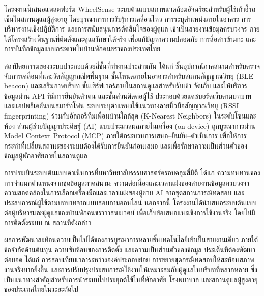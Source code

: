 
โครงงานนี้เสนอแพลตฟอร์ม WheelSense ระบบต้นแบบสภาพแวดล้อมอัจฉริยะสำหรับผู้ใช้เก้าอี้รถเข็นในสถานดูแลผู้สูงอายุ
โดยบูรณาการการรับรู้การเคลื่อนไหว การระบุตำแหน่งภายในอาคาร การบริหารงานเชิงปฏิบัติการ
และการสนับสนุนการตัดสินใจของผู้ดูแล เข้าเป็นสายงานข้อมูลครบวงจร
ภายใต้โครงสร้างพื้นฐานที่ติดตั้งและดูแลรักษาได้จริง
เพื่อแก้ปัญหาความปลอดภัย การสื่อสารข้ามกะ
และการบันทึกข้อมูลแบบกระดาษในบ้านพักคนชราของประเทศไทย

สถาปัตยกรรมของระบบประกอบด้วยสี่ชั้นที่ทำงานประสานกัน
ได้แก่ ชั้นอุปกรณ์ภาคสนามสำหรับตรวจจับการเคลื่อนที่และวัดสัญญาณชีพพื้นฐาน
ชั้นโหนดภายในอาคารสำหรับสแกนสัญญาณวิทยุ (BLE beacon) และเสริมภาพบริบท
ชั้นเซิร์ฟเวอร์ภายในสถานดูแลสำหรับรับเข้า จัดเก็บ
และให้บริการข้อมูลผ่าน API ที่มีการยืนยันตัวตน
และชั้นส่วนติดต่อผู้ใช้ ประกอบด้วยแดชบอร์ดเว็บตามบทบาทและแอปพลิเคชันบนสมาร์ทโฟน
ระบบระบุตำแหน่งใช้แนวทางลายนิ้วมือสัญญาณวิทยุ (RSSI fingerprinting) ร่วมกับอัลกอริทึมเพื่อนบ้านใกล้สุด (K-Nearest Neighbors) ในระดับโซนและห้อง
ส่วนผู้ช่วยปัญญาประดิษฐ์ (AI) แบบประมวลผลภายในเครื่อง (on-device) ถูกบูรณาการผ่าน Model Context Protocol (MCP)
ภายใต้กระบวนการเสนอ--ยืนยัน--ดำเนินการ
เพื่อให้การกระทำที่เปลี่ยนสถานะของระบบต้องได้รับการยืนยันก่อนเสมอ
และเพื่อรักษาความเป็นส่วนตัวของข้อมูลผู้พักอาศัยภายในสถานดูแล

การประเมินระบบต้นแบบดำเนินการที่มหาวิทยาลัยธรรมศาสตร์ครอบคลุมสี่มิติ
ได้แก่ ความทนทานของการจำแนกตำแหน่งจากชุดข้อมูลภาคสนาม;
ความต่อเนื่องและเวลาแฝงของสายงานข้อมูลครบวงจร
ความสอดคล้องในการเลือกเครื่องมือและเวลาแฝงของผู้ช่วย AI จากชุดสถานการณ์ทดสอบ
และประสบการณ์ผู้ใช้ตามบทบาทจากแบบสอบถามออนไลน์
นอกจากนี้ โครงงานได้นำเสนอระบบต้นแบบต่อผู้บริหารและผู้ดูแลของบ้านพักคนชราวาสนะเวศม์
เพื่อเก็บข้อเสนอแนะเชิงการใช้งานจริง โดยไม่มีการติดตั้งระบบ ณ สถานที่ดังกล่าว

ผลการพัฒนาสะท้อนความเป็นไปได้ของการบูรณาการหลายชั้นเทคโนโลยีเข้าเป็นสายงานเดียว
ภายใต้ข้อจำกัดด้านต้นทุน ความซับซ้อนของการติดตั้ง และความเป็นส่วนตัวของข้อมูล
ประเด็นที่ต้องพัฒนาต่อยอด ได้แก่ การสอบเทียบเวลาระหว่างองค์ประกอบย่อย
การขยายชุดกรณีทดสอบให้สะท้อนสภาพงานจริงมากยิ่งขึ้น
และการปรับปรุงประสบการณ์ใช้งานให้เหมาะสมกับผู้ดูแลในบริบทที่หลากหลาย
ซึ่งเป็นแนวทางสำคัญสำหรับการนำระบบไปประยุกต์ใช้ในที่พักอาศัย โรงพยาบาล
และสถานดูแลผู้สูงอายุของประเทศไทยในระยะถัดไป
